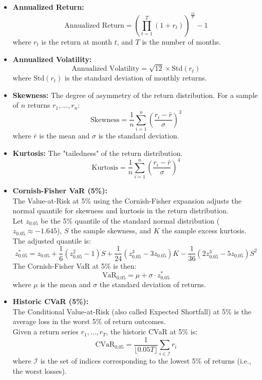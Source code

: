 \documentclass{article}
\begin{document}
\begin{itemize}
    \item \textbf{Annualized Return:}
    \[
    \text{Annualized Return} = \left( \prod_{t=1}^{T} (1 + r_t) \right)^{\frac{12}{T}} - 1
    \]
    where $r_t$ is the return at month $t$, and $T$ is the number of months.

    \item \textbf{Annualized Volatility:}
    \[
    \text{Annualized Volatility} = \sqrt{12} \times \text{Std}(r_t)
    \]
    where $\text{Std}(r_t)$ is the standard deviation of monthly returns.

    \item \textbf{Skewness:}  
    The degree of asymmetry of the return distribution.  
    For a sample of $n$ returns $r_1, ..., r_n$:
    \[
    \text{Skewness} = \frac{1}{n} \sum_{i=1}^{n} \left( \frac{r_i - \bar{r}}{\sigma} \right)^3
    \]
    where $\bar{r}$ is the mean and $\sigma$ is the standard deviation.

    \item \textbf{Kurtosis:}  
    The "tailedness" of the return distribution.  
    \[
    \text{Kurtosis} = \frac{1}{n} \sum_{i=1}^{n} \left( \frac{r_i - \bar{r}}{\sigma} \right)^4
    \]
    \item \textbf{Cornish-Fisher VaR (5\%):}\\
    The Value-at-Risk at 5\% using the Cornish-Fisher expansion adjusts the normal quantile for skewness and kurtosis in the return distribution.\\
    
    Let $z_{0.05}$ be the 5\% quantile of the standard normal distribution ($z_{0.05} \approx -1.645$), $S$ the sample skewness, and $K$ the sample excess kurtosis. The adjusted quantile is:
    \[
    z^*_{0.05} = z_{0.05} + \frac{1}{6}(z_{0.05}^2 - 1)S + \frac{1}{24}(z_{0.05}^3 - 3z_{0.05})K - \frac{1}{36}(2z_{0.05}^3 - 5z_{0.05})S^2
    \]
    The Cornish-Fisher VaR at 5\% is then:
    \[
    \text{VaR}_{0.05} = \mu + \sigma \cdot z^*_{0.05}
    \]
    where $\mu$ is the mean and $\sigma$ the standard deviation of returns.
    
    \item \textbf{Historic CVaR (5\%):}\\
    The Conditional Value-at-Risk (also called Expected Shortfall) at 5\% is the average loss in the worst 5\% of return outcomes.\\
    
    Given a return series $r_1, \dots, r_T$, the historic CVaR at 5\% is:
    \[
    \text{CVaR}_{0.05} = \frac{1}{\lfloor 0.05 T \rfloor} \sum_{i \in \mathcal{I}} r_i
    \]
    where $\mathcal{I}$ is the set of indices corresponding to the lowest 5\% of returns (i.e., the worst losses).


\end{itemize}
\end{document}
